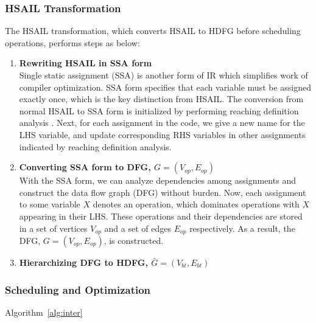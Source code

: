 \documentclass[12pt]{article}
\begin{document}
\begin{CJK}{UTF8}{bkai}
        \subsubsection{HSAIL Transformation}
        \label{sec:trans}
        The HSAIL transformation, which converts HSAIL to HDFG before scheduling operations, performs steps as below:
        \begin{enumerate}
            \item \textbf{Rewriting HSAIL in SSA form} \\
                Single static assignment (SSA) \cite{ssa} is another form of IR which simplifies work of compiler optimization.
                SSA form specifies that each variable must be assigned exactly once, which is the key distinction from HSAIL.
                The conversion from normal HSAIL to SSA form is initialized by performing reaching definition analysis \cite{rda}.
                Next, for each assignment in the code, we give a new name for the LHS variable, and update corresponding RHS variables in other assignments indicated by reaching definition analysis.
            \item \textbf{Converting SSA form to DFG, $G = ( V_{op} , E_{op} )$} \\
                With the SSA form, we can analyze dependencies among assignments and construct the data flow graph (DFG) without burden.
                Now, each assignment to some variable $X$ denotes an operation, which dominates operations with $X$ appearing in their LHS.
                These operations and their dependencies are stored in a set of vertices $V_{op}$ and a set of edges $E_{op}$ respectively.
                As a result, the DFG, $G = ( V_{op} , E_{op} )$, is constructed.
            \item \textbf{Hierarchizing DFG to HDFG,  $\bar{G} = ( V_{bt} , E_{bt} )$} \\
        \end{enumerate}


        \subsubsection{Scheduling and Optimization}
        Algorithm~\ref{alg:inter}
        \label{sec:sando}


\end{CJK}
\end{document}
